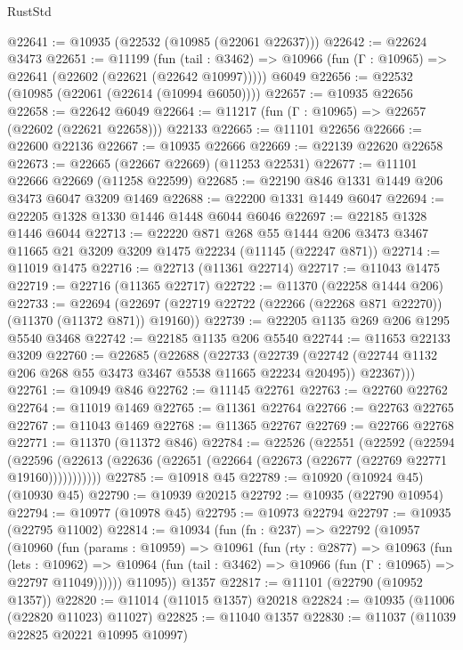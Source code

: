 \begin{lexlean}{RustStd}
\begin{coremodule}
{{{{{{{{{{{{{{{{{{{@22641 := @10935 (@22532 (@10985 (@22061 @22637)))
@22642 := @22624 @3473
@22651 := @11199
    (fun (tail : @3462) => @10966 (fun (Γ : @10965) => @22641 (@22602 (@22621 (@22642 @10997)))))
    @6049
@22656 := @22532 (@10985 (@22061 (@22614 (@10994 @6050))))
@22657 := @10935 @22656
@22658 := @22642 @6049
@22664 := @11217 (fun (Γ : @10965) => @22657 (@22602 (@22621 @22658))) @22133
@22665 := @11101 @22656
@22666 := @22600 @22136
@22667 := @10935 @22666
@22669 := @22139 @22620 @22658
@22673 := @22665 (@22667 @22669) (@11253 @22531)
@22677 := @11101 @22666 @22669 (@11258 @22599)
@22685 := @22190 @846 @1331 @1449 @206 @3473 @6047 @3209 @1469
@22688 := @22200 @1331 @1449 @6047
@22694 := @22205 @1328 @1330 @1446 @1448 @6044 @6046
@22697 := @22185 @1328 @1446 @6044
@22713 := @22220
    @871
    @268
    @55
    @1444
    @206
    @3473
    @3467
    @11665
    @21
    @3209
    @3209
    @1475
    @22234
    (@11145 (@22247 @871))
@22714 := @11019 @1475
@22716 := @22713 (@11361 @22714)
@22717 := @11043 @1475
@22719 := @22716 (@11365 @22717)
@22722 := @11370 (@22258 @1444 @206)
@22733 := @22694
    (@22697 (@22719 @22722 (@22266 (@22268 @871 @22270)) (@11370 (@11372 @871)) @19160))
@22739 := @22205 @1135 @269 @206 @1295 @5540 @3468
@22742 := @22185 @1135 @206 @5540
@22744 := @11653 @22133 @3209
@22760 := @22685
    (@22688
      (@22733
        (@22739
          (@22742 (@22744 @1132 @206 @268 @55 @3473 @3467 @5538 @11665 @22234 @20495))
          @22367)))
@22761 := @10949 @846
@22762 := @11145 @22761
@22763 := @22760 @22762
@22764 := @11019 @1469
@22765 := @11361 @22764
@22766 := @22763 @22765
@22767 := @11043 @1469
@22768 := @11365 @22767
@22769 := @22766 @22768
@22771 := @11370 (@11372 @846)
@22784 := @22526
    (@22551
      (@22592
        (@22594
          (@22596 (@22613 (@22636 (@22651 (@22664 (@22673 (@22677 (@22769 @22771 @19160)))))))))))
@22785 := @10918 @45
@22789 := @10920 (@10924 @45) (@10930 @45)
@22790 := @10939 @20215
@22792 := @10935 (@22790 @10954)
@22794 := @10977 (@10978 @45)
@22795 := @10973 @22794
@22797 := @10935 (@22795 @11002)
@22814 := @10934
    (fun (fn : @237) =>
    @22792
      (@10957
        (@10960
          (fun (params : @10959) =>
          @10961
            (fun (rty : @2877) =>
            @10963
              (fun (lets : @10962) =>
              @10964 (fun (tail : @3462) => @10966 (fun (Γ : @10965) => @22797 @11049))))))
        @11095))
    @1357
@22817 := @11101 (@22790 (@10952 @1357))
@22820 := @11014 (@11015 @1357) @20218
@22824 := @10935 (@11006 (@22820 @11023) @11027)
@22825 := @11040 @1357
@22830 := @11037 (@11039 @22825 @20221 @10995 @10997)
}}}}}}}}}}}}}}}}}}}
\end{coremodule}
\end{lexlean}

